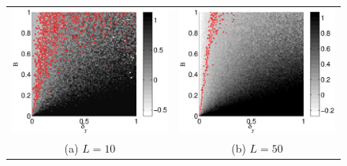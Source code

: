 \documentclass[twocolumn,aps,pre,groupedaddress]{revtex4-1}
\begin{document}
\begin{figure}[ht]
\begin{tabular}{cc}
\includegraphics[scale=0.30]{SimpleIRexample_diffLpart1.eps} &
\includegraphics[scale=0.30]{SimpleIRexample_diffLpart2.eps} \\
(a) $L=10$ & (b) $L=50$ \\

\end{tabular}
\end{figure}
\end{document}
